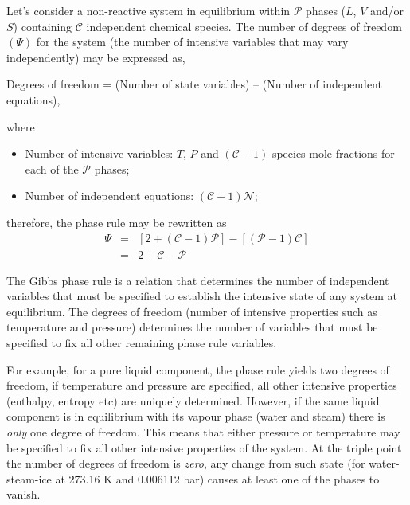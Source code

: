   Let's consider a non-reactive system in equilibrium within $\mathcal{P}$ phases  (\ie $L$, $V$ and/or $S$) containing $\mathcal{C}$ independent chemical species.  The number of degrees of freedom $\left(\Psi\right)$ for the system (\ie the number of intensive variables that may vary independently) may be expressed as,
  \begin{shaded}
    \begin{center}
      Degrees of freedom = (Number of state variables) – (Number of independent equations),
    \end{center}
    \noindent where
    \begin{itemize}
       \item Number of intensive variables: $T$, $P$ and $\left(\mathcal{C}-1\right)$ species mole fractions for each of the $\mathcal{P}$ phases;
        \item Number of independent equations: $\left(\mathcal{C}-1\right)\mathcal{N}$;
    \end{itemize}
    therefore, the phase rule may be rewritten as
    \begin{eqnarray}
       \Psi &=& \left[2 + \left(\mathcal{C}-1\right)\mathcal{P}\right] - \left[\left(\mathcal{P}-1\right)\mathcal{C}\right] \nonumber \\
            &=& 2 + \mathcal{C} - \mathcal{P}\label{Chapter:VolumetricPropertiesPureSubstances:Eqn:PhaseRule}
    \end{eqnarray}  
  \end{shaded}
  The Gibbs phase rule is a relation that determines the number of independent variables that must be specified to establish the intensive state of any system at equilibrium. The degrees of freedom (\ie number of intensive properties such as temperature and pressure) determines the number of variables that must be specified to fix all other remaining phase rule variables. 

For example, for a pure liquid component, the phase rule yields two degrees of freedom, \ie if temperature and pressure are specified, all other intensive properties (\eg enthalpy, entropy etc) are uniquely determined. However, if the same liquid component is in equilibrium with its vapour phase (\eg water and steam) there is {\it only} one degree of freedom. This means that either pressure or temperature may be specified to fix all other intensive properties of the system. At the triple point the number of degrees of freedom is {\it zero}, \ie any change from such state (\eg for water-steam-ice at 273.16 K and 0.006112 bar) causes at least one of the phases to vanish.


